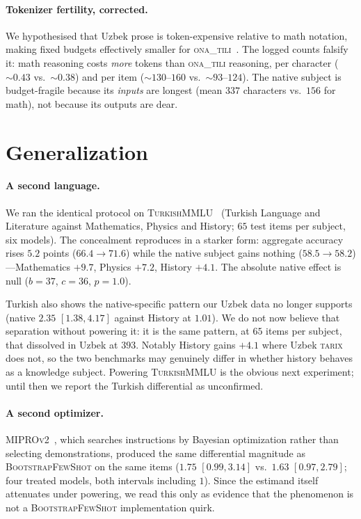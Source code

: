 \documentclass[11pt]{article}
\newcommand{\ona}{\textsc{ona\_tili}}
\newcommand{\tarix}{\textsc{tarix}}
\newcommand{\bsfs}{\textsc{BootstrapFewShot}}
\begin{document}
\paragraph{Tokenizer fertility, corrected.} We hypothesised that Uzbek prose is
token-expensive relative to math notation, making fixed budgets effectively smaller for
\ona{}~\citep[cf.][]{petrov2023tokenizer,lundin2025tokentax}. The logged counts falsify
it: math reasoning costs \emph{more} tokens than \ona{} reasoning, per character
(${\sim}0.43$ vs.\ ${\sim}0.38$) and per item (${\sim}130$--$160$ vs.\ ${\sim}93$--$124$).
The native subject is budget-fragile because its \emph{inputs} are longest (mean $337$
characters vs.\ $156$ for math), not because its outputs are dear.

\section{Generalization}\label{sec:travel}

\paragraph{A second language.} We ran the identical protocol on
\textsc{TurkishMMLU}~\citep{turkishmmlu2024} (Turkish Language and Literature against
Mathematics, Physics and History; $65$ test items per subject, six models). The
concealment reproduces in a starker form: aggregate accuracy rises $5.2$ points
($66.4{\to}71.6$) while the native subject gains nothing ($58.5{\to}58.2$)---Mathematics
$+9.7$, Physics $+7.2$, History $+4.1$. The absolute native effect is null
($b{=}37$, $c{=}36$, $p{=}1.0$).

Turkish also shows the native-specific pattern our Uzbek data no longer supports
(native $2.35$ $[1.38, 4.17]$ against History at $1.01$). We do not now believe that
separation without powering it: it is the same pattern, at $65$ items per subject, that
dissolved in Uzbek at $393$. Notably History gains $+4.1$ where Uzbek \tarix{} does not,
so the two benchmarks may genuinely differ in whether history behaves as a knowledge
subject. Powering \textsc{TurkishMMLU} is the obvious next experiment; until then we
report the Turkish differential as unconfirmed.

\paragraph{A second optimizer.} \textsc{MIPROv2}~\citep{opsahlong2024mipro}, which
searches instructions by Bayesian optimization rather than selecting demonstrations,
produced the same differential magnitude as \bsfs{} on the same items
($1.75$ $[0.99, 3.14]$ vs.\ $1.63$ $[0.97, 2.79]$; four treated models, both intervals
including $1$). Since the estimand itself attenuates under powering, we read this only as
evidence that the phenomenon is not a \bsfs{} implementation quirk.
\end{document}
